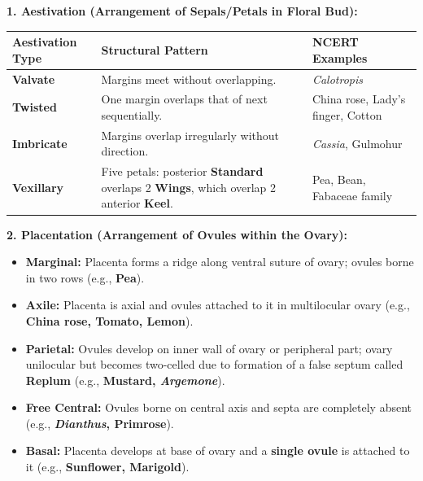 \documentclass[10pt,twoside,openright]{book}
\begin{document}
\begin{conceptbox}
\textbf{1. Aestivation (Arrangement of Sepals/Petals in Floral Bud):}
\begin{center}
\footnotesize
\setlength{\tabcolsep}{3pt}
\renewcommand{\arraystretch}{1.2}
\begin{tabularx}{\linewidth}{|l|X|p{3.0cm}|}
\hline
\textbf{Aestivation Type} & \textbf{Structural Pattern} & \textbf{NCERT Examples} \\
\hline
\textbf{Valvate} & Margins meet without overlapping. & \textit{Calotropis} \\
\hline
\textbf{Twisted} & One margin overlaps that of next sequentially. & China rose, Lady's finger, Cotton \\
\hline
\textbf{Imbricate} & Margins overlap irregularly without direction. & \textit{Cassia}, Gulmohur \\
\hline
\textbf{Vexillary} & Five petals: posterior \textbf{Standard} overlaps 2 \textbf{Wings}, which overlap 2 anterior \textbf{Keel}. & Pea, Bean, Fabaceae family \\
\hline
\end{tabularx}
\end{center}

\textbf{2. Placentation (Arrangement of Ovules within the Ovary):}
\begin{itemize}[leftmargin=*]
  \item \textbf{Marginal:} Placenta forms a ridge along ventral suture of ovary; ovules borne in two rows (e.g., \textbf{Pea}).
  \item \textbf{Axile:} Placenta is axial and ovules attached to it in multilocular ovary (e.g., \textbf{China rose, Tomato, Lemon}).
  \item \textbf{Parietal:} Ovules develop on inner wall of ovary or peripheral part; ovary unilocular but becomes two-celled due to formation of a false septum called \textbf{Replum} (e.g., \textbf{Mustard, \textit{Argemone}}).
  \item \textbf{Free Central:} Ovules borne on central axis and septa are completely absent (e.g., \textbf{\textit{Dianthus}, Primrose}).
  \item \textbf{Basal:} Placenta develops at base of ovary and a \textbf{single ovule} is attached to it (e.g., \textbf{Sunflower, Marigold}).
\end{itemize}


\end{conceptbox}
\end{document}
